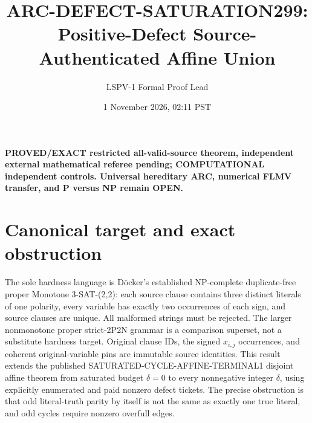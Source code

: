 \documentclass[11pt]{article}
\title{ARC-DEFECT-SATURATION299: Positive-Defect Source-Authenticated Affine Union}
\author{LSPV-1 Formal Proof Lead}
\date{1 November 2026, 02:11 PST}
\begin{document}
\maketitle
\noindent\textbf{PROVED/EXACT restricted all-valid-source theorem, independent external mathematical referee pending; COMPUTATIONAL independent controls. Universal hereditary ARC, numerical FLMV transfer, and P versus NP remain OPEN.}
\section{Canonical target and exact obstruction}
The sole hardness language is D\"ocker's established NP-complete duplicate-free proper Monotone 3-SAT-(2,2): each source clause contains three distinct literals of one polarity, every variable has exactly two occurrences of each sign, and source clauses are unique. All malformed strings must be rejected. The larger nonmonotone proper strict-2P2N grammar is a comparison superset, not a substitute hardness target. Original clause IDs, the signed $x_{i,j}$ occurrences, and coherent original-variable pins are immutable source identities.
This result extends the published SATURATED-CYCLE-AFFINE-TERMINAL1 disjoint affine theorem from saturated budget $\delta=0$ to every nonnegative integer $\delta$, using explicitly enumerated and paid nonzero defect tickets. The precise obstruction is that odd literal-truth parity by itself is not the same as exactly one true literal, and odd cycles require nonzero overfull edges.
\end{document}

